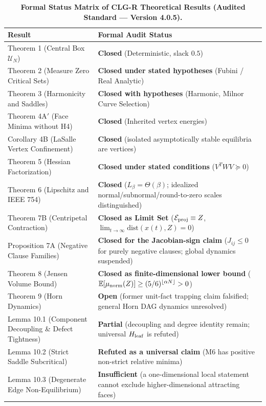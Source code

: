 \documentclass[11pt,a4paper]{article}
\begin{document}
\begin{table}[htbp]
\centering
\footnotesize
\caption{\textbf{Formal Status Matrix of CLG-R Theoretical Results (Audited Standard --- Version 4.0.5).}}
\begin{tabularx}{\textwidth}{@{}lX@{}}
\toprule
\textbf{Result} & \textbf{Formal Audit Status} \\
\midrule
Theorem 1 (Central Box $\mathcal{U}_N$) & \textbf{Closed} (Deterministic, slack $0.5$) \\
Theorem 2 (Measure Zero Critical Sets) & \textbf{Closed under stated hypotheses} (Fubini / Real Analytic) \\
Theorem 3 (Harmonicity and Saddles) & \textbf{Closed with hypotheses} (Harmonic, Milnor Curve Selection) \\
Theorem 4A$'$ (Face Minima without H4) & \textbf{Closed} (Inherited vertex energies) \\
Corollary 4B (LaSalle Vertex Confinement) & \textbf{Closed} (isolated asymptotically stable equilibria are vertices) \\
Theorem 5 (Hessian Factorization) & \textbf{Closed under stated conditions} ($V^T W V \succeq 0$) \\
Theorem 6 (Lipschitz and IEEE 754) & \textbf{Closed} ($L_\beta=\Theta(\beta)$; idealized normal/subnormal/round-to-zero scales distinguished) \\
Theorem 7B (Centripetal Contraction) & \textbf{Closed as Limit Set} ($\mathcal{E}_{\rm proj} \equiv Z$, $\lim_{t \to \infty} \text{dist}(x(t), Z) = 0$) \\
Proposition 7A (Negative Clause Families) & \textbf{Closed for the Jacobian-sign claim} ($J_{ij}\le0$ for purely negative clauses; global dynamics suspended) \\
Theorem 8 (Jensen Volume Bound) & \textbf{Closed as finite-dimensional lower bound} ($\mathbb{E}[\mu_{\rm norm}(Z)] \ge (5/6)^{\lfloor \alpha N \rfloor} > 0$) \\
Theorem 9 (Horn Dynamics) & \textbf{Open} (former unit-fact trapping claim falsified; general Horn DAG dynamics unresolved) \\
Lemma 10.1 (Component Decoupling \& Defect Tightness) & \textbf{Partial} (decoupling and degree identity remain; universal $H_{\rm leaf}$ is refuted) \\
Lemma 10.2 (Strict Saddle Subcritical) & \textbf{Refuted as a universal claim} (M6 has positive non-strict relative minima) \\
Lemma 10.3 (Degenerate Edge Non-Equilibrium) & \textbf{Insufficient} (a one-dimensional local statement cannot exclude higher-dimensional attracting faces) \\

\end{tabularx}
\end{table}
\end{document}
